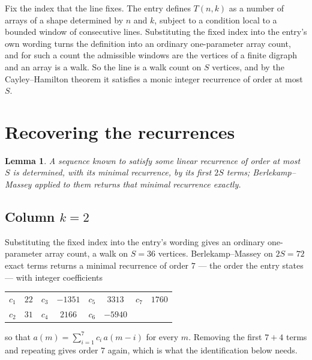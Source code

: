 \documentclass[11pt,a4paper]{article}
\theoremstyle{plain}
\newtheorem{lemma}[theorem]{Lemma}
\theoremstyle{definition}
\begin{document}
Fix the index that the line fixes. The entry defines $T(n,k)$ as a number of arrays of a shape
determined by $n$ and $k$, subject to a condition local to a bounded window of consecutive
lines. Substituting the fixed index into the entry's own wording turns the definition into an
ordinary one-parameter array count, and for such a count the admissible windows are the
vertices of a finite digraph and an array is a walk. So the line is a walk count on $S$
vertices, and by the Cayley--Hamilton theorem it satisfies a monic integer recurrence of order
at most $S$.

\section{Recovering the recurrences}

\begin{lemma}\label{lem:bm}
A sequence known to satisfy some linear recurrence of order at most $S$ is determined, with its
minimal recurrence, by its first $2S$ terms; Berlekamp--Massey applied to them returns that
minimal recurrence exactly.
\end{lemma}

\subsection*{Column $k=2$}
Substituting the fixed index into the entry's wording gives an ordinary one-parameter array
count, a walk on $S=36$ vertices. Berlekamp--Massey on $2S=72$ exact terms
returns a minimal recurrence of order $7$ --- the order the entry states --- with
integer coefficients
\begin{center}\small\begin{tabular}{cccccccc}
$c_{1}$ & $22$ & $c_{3}$ & $-1351$ & $c_{5}$ & $3313$ & $c_{7}$ & $1760$ \\
$c_{2}$ & $31$ & $c_{4}$ & $2166$ & $c_{6}$ & $-5940$ &  &  \\
\end{tabular}\end{center}
so that $a(m)=\sum_{i=1}^{7}c_i\,a(m-i)$ for every $m$. Removing the first
$7+4$ terms and repeating gives order $7$ again, which is what the
identification below needs.
\end{document}
